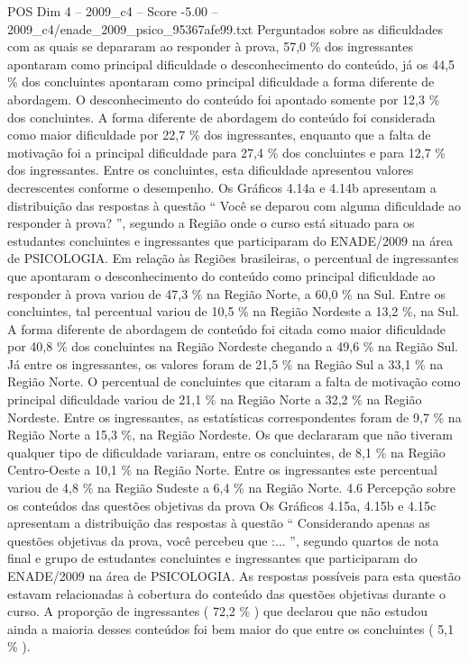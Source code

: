 \begin{textsample}{POS Dim 4 – 2009\_c4 – Score -5.00 – 2009\_c4/enade\_2009\_psico\_95367afe99.txt}
Perguntados sobre as dificuldades com as quais se depararam ao responder à prova, 57,0 \% dos ingressantes apontaram como principal dificuldade o desconhecimento do conteúdo, já os 44,5 \% dos concluintes apontaram como principal dificuldade a forma diferente de abordagem.
O desconhecimento do conteúdo foi apontado somente por 12,3 \% dos concluintes.
A forma diferente de abordagem do conteúdo foi considerada como maior dificuldade por 22,7 \% dos ingressantes, enquanto que a falta de motivação foi a principal dificuldade para 27,4 \% dos concluintes e para 12,7 \% dos ingressantes.
Entre os concluintes, esta dificuldade apresentou valores decrescentes conforme o desempenho.
Os Gráficos 4.14a e 4.14b apresentam a distribuição das respostas à questão “ Você se deparou com alguma dificuldade ao responder à prova? ”, segundo a Região onde o curso está situado para os estudantes concluintes e ingressantes que participaram do ENADE/2009 na área de PSICOLOGIA.
Em relação às Regiões brasileiras, o percentual de ingressantes que apontaram o desconhecimento do conteúdo como principal dificuldade ao responder à prova variou de 47,3 \% na Região Norte, a 60,0 \% na Sul.
Entre os concluintes, tal percentual variou de 10,5 \% na Região Nordeste a 13,2 \%, na Sul.
A forma diferente de abordagem de conteúdo foi citada como maior dificuldade por 40,8 \% dos concluintes na Região Nordeste chegando a 49,6 \% na Região Sul.
Já entre os ingressantes, os valores foram de 21,5 \% na Região Sul a 33,1 \% na Região Norte.
O percentual de concluintes que citaram a falta de motivação como principal dificuldade variou de 21,1 \% na Região Norte a 32,2 \% na Região Nordeste.
Entre os ingressantes, as estatísticas correspondentes foram de 9,7 \% na Região Norte a 15,3 \%, na Região Nordeste.
Os que declararam que não tiveram qualquer tipo de dificuldade variaram, entre os concluintes, de 8,1 \% na Região Centro-Oeste a 10,1 \% na Região Norte.
Entre os ingressantes este percentual variou de 4,8 \% na Região Sudeste a 6,4 \% na Região Norte. 4.6 Percepção sobre os conteúdos das questões objetivas da prova Os Gráficos 4.15a, 4.15b e 4.15c apresentam a distribuição das respostas à questão “ Considerando apenas as questões objetivas da prova, você percebeu que :... ”, segundo quartos de nota final e grupo de estudantes concluintes e ingressantes que participaram do ENADE/2009 na área de PSICOLOGIA.
As respostas possíveis para esta questão estavam relacionadas à cobertura do conteúdo das questões objetivas durante o curso.
A proporção de ingressantes ( 72,2 \% ) que declarou que não estudou ainda a maioria desses conteúdos foi bem maior do que entre os concluintes ( 5,1 \% ).

\end{textsample}
